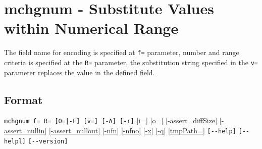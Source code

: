 %

\section{mchgnum - Substitute Values within Numerical Range\label{sect:mchgnum}}
The field name for encoding is specified at \verb|f=| parameter, number and range criteria is specified at the \verb|R=| parameter, the substitution string specified in the \verb|v=| parameter replaces the value in the defined field.

\subsection*{Format}
\verb/mchgnum f= R= [O=|-F] [v=] [-A] [-r]/
\hyperref[sect:option_i]{[i=]}
\hyperref[sect:option_o]{[o=]}
\hyperref[sect:option_assert_diffSize]{[-assert\_diffSize]}
\hyperref[sect:option_assert_nullin]{[-assert\_nullin]}
\hyperref[sect:option_assert_nullout]{[-assert\_nullout]}
\hyperref[sect:option_nfn]{[-nfn]} 
\hyperref[sect:option_nfno]{[-nfno]}  
\hyperref[sect:option_x]{[-x]}
\hyperref[sect:option_q]{[-q]}
\hyperref[sect:option_option_tmppath]{[tmpPath=]}
\verb|[--help]|
\verb|[--helpl]|
\verb|[--version]|\\

